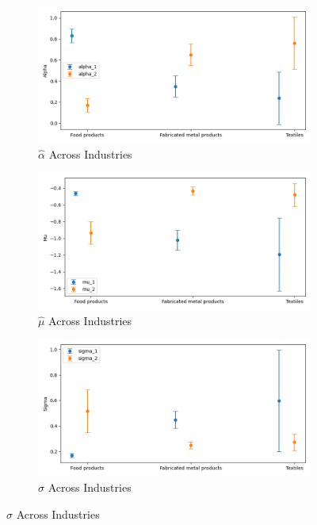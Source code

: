 \documentclass{article}
\begin{document}
\begin{figure}[ht!]
    \centering 
    \caption{Stationary Normal Model Across Industries}
    \begin{subfigure}[t]{0.32\textwidth}
        \centering
        \includegraphics[width=\textwidth]{figure/stationary_normal_alpha_across_industries.png}
        \caption{$\hat\alpha$ Across Industries}
    \end{subfigure}
    \begin{subfigure}[t]{0.32\textwidth}
        \centering
        \includegraphics[width=\textwidth]{figure/stationary_normal_mu_across_industries.png}
        \caption{$\hat\mu$ Across Industries}
    \end{subfigure}
    \begin{subfigure}[t]{0.32\textwidth}
        \centering
        \includegraphics[width=\textwidth]{figure/stationary_normal_sigma_across_industries.png}
        \caption{$\hat\sigma$ Across Industries}
    \end{subfigure}
\end{figure}
\end{document}
